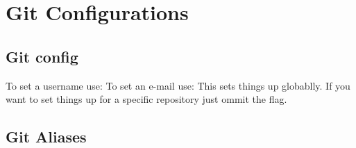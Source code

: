\chapter{Git Configurations}
\chapteroverlay

\section{Git config}
To set a username use: 
\newline\noindent To set an e-mail use: 
\newline\noindent This sets things up globablly. If you want to set things up for a specific repository just ommit the  flag.

\section{Git Aliases}